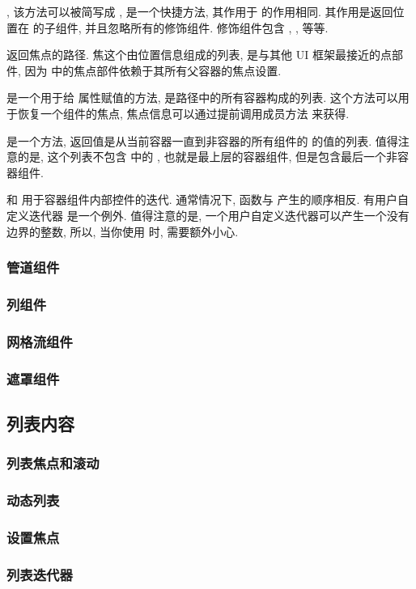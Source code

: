 \indent{}, 该方法可以被简写成 , 是一个快捷方法, 其作用于  的作用相同. 其作用是返回位置在  的子组件, 并且忽略所有的修饰组件. 修饰组件包含 , ,  等等.

\indent{} 返回焦点的路径. 焦这个由位置信息组成的列表, 是与其他 UI 框架最接近的点部件, 因为 \urwid{} 中的焦点部件依赖于其所有父容器的焦点设置.

\indent{} 是一个用于给  属性赋值的方法,  是路径中的所有容器构成的列表. 这个方法可以用于恢复一个组件的焦点, 焦点信息可以通过提前调用成员方法  来获得.

\indent{} 是一个方法, 返回值是从当前容器一直到非容器的所有组件的  的值的列表. 值得注意的是, 这个列表不包含  中的 , 也就是最上层的容器组件, 但是包含最后一个非容器组件.

\indent{} 和  用于容器组件内部控件的迭代. 通常情况下,  函数与  产生的顺序相反. 有用户自定义迭代器  是一个例外. 值得注意的是, 一个用户自定义迭代器可以产生一个没有边界的整数, 所以, 当你使用  时, 需要额外小心.

\subsubsection{管道组件}

\subsubsection{列组件}

\subsubsection{网格流组件}

\subsubsection{遮罩组件}

\subsection{列表内容}

\subsubsection{列表焦点和滚动}

\subsubsection{动态列表}

\subsubsection{设置焦点}

\subsubsection{列表迭代器}